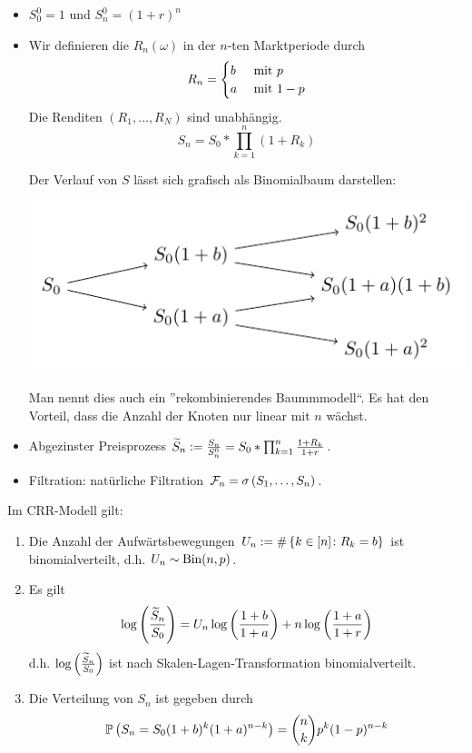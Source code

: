 \begin{itemize}
	\item $S_0^0 = 1$ und $S_n^0 = (1+r)^n$
	\item Wir definieren die  $R_n(\omega)$ in der $n$-ten Marktperiode durch
	\begin{equation*}
		R_n = \begin{cases} b & \mit p \\ a & \mit 1-p \end{cases}
	\end{equation*}
	Die Renditen $(R_1, \dots, R_N)$ sind unabhängig.
	\begin{equation*}
		S_n = S_0 * \prod_{k=1}^n (1+R_k)
	\end{equation*}
	
	Der Verlauf von $S$ lässt sich grafisch als Binomialbaum darstellen:
	
	\begin{center}
		\includegraphics[width=.5\textwidth]{stochv_abbildungen/stochv_1_2_crr.pdf}
	\end{center}
	
	Man nennt dies auch ein ''rekombinierendes Baummmodell``. Es hat den Vorteil, dass die Anzahl der Knoten nur linear mit $n$ wächst.
	
	\item Abgezinster Preisprozess $\schlange{S}_n \defeq \frac{S_n}{S_n^0} = S_0 * \prod_{k=1}^n \frac{1+R_k}{1+r}$.
	
	\item Filtration: natürliche Filtration $\F_n = \sigma \brackets{S_1, \dots, S_n}$.
\end{itemize}

\begin{proposition} %
	Im CRR-Modell gilt:
	\begin{enumerate}[label=(\alph*)]
		\item Die Anzahl der Aufwärtsbewegungen $U_n \defeq \# \menge{k \in [n] \colon R_k = b}$ ist binomialverteilt, d.h. $U_n \sim \Bin(n,p)$.
		\item Es gilt 
		\begin{equation*}
			\log\brackets{\frac{\schlange{S}_n}{S_0}} = U_n \log\brackets{\frac{1+b}{1+a}} + n \log\brackets{\frac{1+a}{1+r}}
		\end{equation*}
		d.h. $\log\brackets{\frac{\schlange{S}_n}{S_0}}$ ist nach Skalen-Lagen-Transformation binomialverteilt.
		\item Die Verteilung von $S_n$ ist gegeben durch
		\begin{equation*}
			\P\brackets{S_n = S_0 (1+b)^k (1+a)^{n-k}} = \binom{n}{k} p^k (1-p)^{n-k}
		\end{equation*} 
	\end{enumerate}
\end{proposition}

